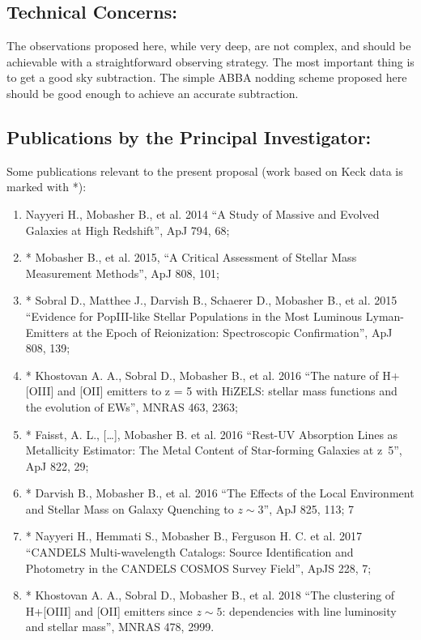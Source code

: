 \documentclass[letter,12pt]{article}
\begin{document}
\subsection{Technical Concerns:}

The observations proposed here, while very deep, are not complex, and should be
achievable with a straightforward observing strategy. The most important thing
is to get a good sky subtraction. The simple ABBA nodding scheme proposed here
should be good enough to achieve an accurate subtraction.

\subsection{Publications by the Principal Investigator:}

Some publications relevant to the present proposal (work based on Keck data is marked with *):
\begin{enumerate}
  \item Nayyeri H., Mobasher B., et al. 2014 ``A Study of Massive and Evolved Galaxies at
        High Redshift'', ApJ 794, 68;
  \item * Mobasher B., et al. 2015, ``A Critical Assessment of Stellar Mass Measurement
          Methods'', ApJ 808, 101;
  \item * Sobral D., Matthee J., Darvish B., Schaerer D., Mobasher B., et al. 2015 ``Evidence
          for PopIII-like Stellar Populations in the Most Luminous Lyman-Emitters at the
          Epoch of Reionization: Spectroscopic Confirmation'', ApJ 808, 139;
  \item * Khostovan A. A., Sobral D., Mobasher B., et al. 2016 ``The nature of H\textbeta+[OIII]
          and [OII] emitters to z = 5 with HiZELS: stellar mass functions and the evolution of
          EWs'', MNRAS 463, 2363;
  \item * Faisst, A. L., [\ldots], Mobasher B. et al. 2016 ``Rest-UV Absorption Lines as Metallicity
          Estimator: The Metal Content of Star-forming Galaxies at z~5'', ApJ 822, 29;
  \item * Darvish B., Mobasher B., et al. 2016 ``The Effects of the Local Environment and
          Stellar Mass on Galaxy Quenching to \(z \sim 3\)'', ApJ 825, 113; 7
  \item * Nayyeri H., Hemmati S., Mobasher B., Ferguson H. C. et al. 2017 ``CANDELS
          Multi-wavelength Catalogs: Source Identification and Photometry in the CANDELS
          COSMOS Survey Field'', ApJS 228, 7;
  \item * Khostovan A. A., Sobral D., Mobasher B., et al. 2018 ``The clustering of H\textbeta+[OIII]
          and [OII] emitters since \(z \sim 5\): dependencies with line luminosity and stellar mass'',
          MNRAS 478, 2999.
\end{enumerate}
\end{document}
